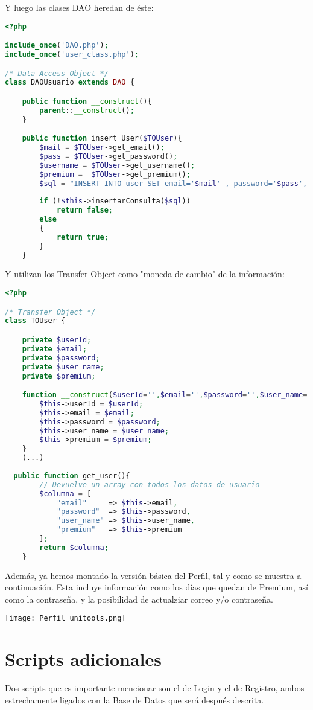 \documentclass[12pt]{report}
\begin{document}
Y luego las clases DAO heredan de éste:
\newline
\begin{lstlisting}[language=PHP]
<?php

include_once('DAO.php');
include_once('user_class.php');

/* Data Access Object */
class DAOUsuario extends DAO {

	public function __construct(){
		parent::__construct();
	}

	public function insert_User($TOUser){
		$mail = $TOUser->get_email();
        $pass = $TOUser->get_password();
        $username = $TOUser->get_username();
        $premium =  $TOUser->get_premium();
		$sql = "INSERT INTO user SET email='$mail' , password='$pass', username='$username', premium='$premium'";
		
		if (!$this->insertarConsulta($sql))
			return false;
		else 
		{
			return true;
		}
	}
\end{lstlisting}

Y utilizan los Transfer Object como "moneda de cambio" de la información:
\newline
\begin{lstlisting}[language=PHP]
<?php

/* Transfer Object */
class TOUser {

	private $userId;
	private $email;
	private $password;
	private $user_name;
	private $premium;

	function __construct($userId='',$email='',$password='',$user_name='',$premium=''){
		$this->userId = $userId;
		$this->email = $email;
		$this->password = $password;
		$this->user_name = $user_name;
		$this->premium = $premium;
	}
	(...)
	
  public function get_user(){
		// Devuelve un array con todos los datos de usuario
		$columna = [
		    "email"     => $this->email,
		    "password"  => $this->password,
		    "user_name" => $this->user_name,
		    "premium"   => $this->premium
		];
		return $columna;
	}
\end{lstlisting}
Además, ya hemos montado la versión básica del Perfil, tal y como se muestra a continuación. Esta incluye información como los días que quedan de Premium, así como la contraseña, y la posibilidad de actualziar correo y/o contraseña.
\newline

\texttt{[image: Perfil\_unitools.png]}

 \newpage
\section{Scripts adicionales}
Dos scripts que es importante mencionar son el de Login y el de Registro, ambos estrechamente ligados con la Base de Datos que será después descrita. 
\end{document}
